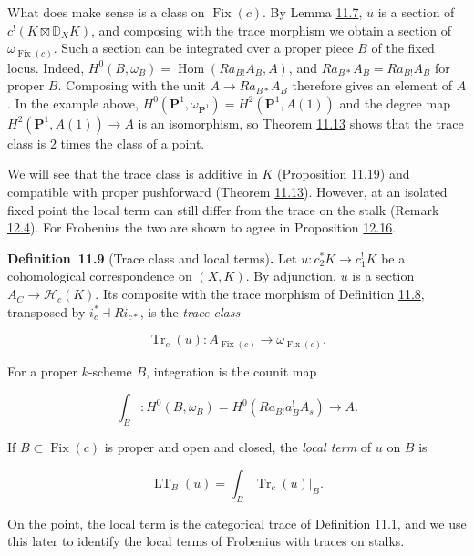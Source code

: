\documentclass[11pt]{article}
\newenvironment{bpstatement}[2]{\par\addvspace{0.6\baselineskip}\noindent\textbf{#1}#2\textbf{.}\enspace\ignorespaces}
  {\par\addvspace{0.4\baselineskip}}
\providecommand{\Fix}{}\renewcommand{\Fix}{\operatorname{Fix}}
\begin{document}
What does make sense is a class on \(\Fix(c)\). By Lemma \hyperref[bp191]{11.7}, \(u\) is a section of \(c^!(K\boxtimes\mathbb D_XK)\), and composing with the trace morphism we obtain a section of \(\omega_{\Fix(c)}\). Such a section can be integrated over a proper piece \(B\) of the fixed locus. Indeed, \(H^0(B,\omega_B)=\operatorname{Hom}(Ra_{B!}A_B,A)\), and \(Ra_{B*}A_B=Ra_{B!}A_B\) for proper \(B\). Composing with the unit \(A\to Ra_{B*}A_B\) therefore gives an element of \(A\). In the example above, \(H^0(\mathbf P^1,\omega_{\mathbf P^1})=H^2(\mathbf P^1,A(1))\) and the degree map \(H^2(\mathbf P^1,A(1))\to A\) is an isomorphism, so Theorem \hyperref[bp206]{11.13} shows that the trace class is \(2\) times the class of a point.

We will see that the trace class is additive in \(K\) (Proposition \hyperref[bp223]{11.19}) and compatible with proper pushforward (Theorem \hyperref[bp206]{11.13}). However, at an isolated fixed point the local term can still differ from the trace on the stalk (Remark \hyperref[bp239]{12.4}). For Frobenius the two are shown to agree in Proposition \hyperref[bp274]{12.16}.

\label{bp197}%
\begin{bpstatement}{Definition~11.9}{ (Trace class and local terms)}
Let \(u:c_2^*K\to c_1^!K\) be a cohomological correspondence on \((X,K)\). By adjunction, \(u\) is a section \(A_C\to\mathcal H_c(K)\). Its composite with the trace morphism of Definition \hyperref[bp194]{11.8}, transposed by \(i_c^*\dashv Ri_{c*}\), is the \emph{trace class}

\[
\operatorname{Tr}_c(u):A_{\Fix(c)}\longrightarrow\omega_{\Fix(c)}.
\]

For a proper \(k\)-scheme \(B\), integration is the counit map

\[
\int_B:H^0(B,\omega_B)
=H^0(Ra_{B!}a_B^!A_s)\longrightarrow A.
\]

If \(B\subset \Fix(c)\) is proper and open and closed, the \emph{local term} of \(u\) on \(B\) is

\[
\operatorname{LT}_B(u)=\int_B\operatorname{Tr}_c(u)|_B.
\]
\end{bpstatement}

\label{bp198}%
On the point, the local term is the categorical trace of Definition \hyperref[bp174]{11.1}, and we use this later to identify the local terms of Frobenius with traces on stalks.
\end{document}
